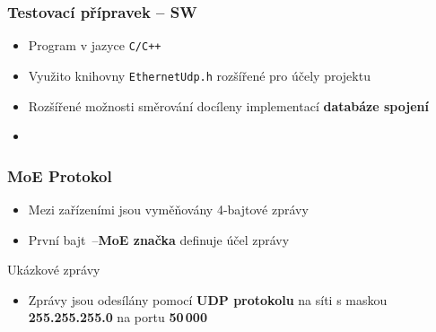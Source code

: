 \documentclass[%
  12pt,       				%
	t,                  %
	aspectratio=1610,   %
	unicode,						%
]{beamer}				    	%
\begin{document}
\begin{frame}
	\frametitle{Testovací přípravek -- SW}
	\begin{itemize}
		\item Program v jazyce \texttt{C/C++}
		\item Využito knihovny \texttt{EthernetUdp.h} rozšířené pro účely projektu
		\item Rozšířené možnosti směrování docíleny implementací \textbf{databáze spojení}
		\item 
	\end{itemize}
\end{frame}

\begin{frame}
	\frametitle{MoE Protokol}
	\begin{itemize}
		\item Mezi zařízeními jsou vyměňovány 4-bajtové zprávy
		\item První bajt~--\textbf{MoE značka} definuje účel zprávy
	\end{itemize}
	\vspace{3ex}
	\begin{block}{Ukázkové zprávy}
	\end{block}
	\vspace{3ex}
	\begin{itemize}
		\item Zprávy jsou odesílány pomocí \textbf{UDP protokolu} na síti s maskou \textbf{255.255.255.0} na portu \textbf{50\,000}
	\end{itemize}
\end{frame}
\end{document}
